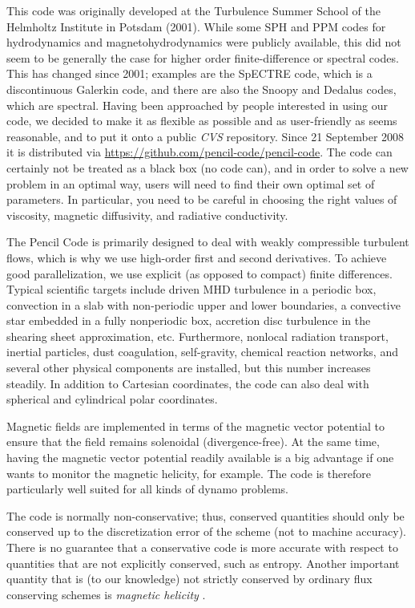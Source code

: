 \documentclass[\mydriver,12pt,twoside,notitlepage,a4paper]{article}
\makeatletter
\newcommand{\name}[2][]{%
  \def\index@{#1}%
  \textsl{#2\/}%
  \ifx\index@\@empty\index{#2@\MakeUppercase #2}%
  \else\index{#1}%
  \fi%
}
\makeatother
\begin{document}
This code was originally developed at the Turbulence Summer School of the
Helmholtz Institute in Potsdam (2001).
While some SPH and PPM codes for hydrodynamics and magnetohydrodynamics
were publicly available, this did not seem to be generally
the case for higher order finite-difference or spectral codes.
This has changed since 2001; examples are the SpECTRE code,
which is a discontinuous Galerkin code, and there are also the
Snoopy and Dedalus codes, which are spectral.
Having been approached by people interested in using our code, we
decided to make it as flexible as possible and as user-friendly as seems
reasonable, and to put it onto a public \name{CVS} repository.
Since 21 September 2008 it is distributed via
\url{https://github.com/pencil-code/pencil-code}.
The code can certainly not be treated as a black box (no code can), and in
order to solve a new problem in an optimal way, users will need to find their
own optimal set of parameters.
In particular, you need to be careful in choosing
the right values of viscosity, magnetic diffusivity, and radiative
conductivity.

The {\sc Pencil Code} is primarily designed to deal with weakly compressible
turbulent flows, which is why we use high-order first and second derivatives.
To achieve good parallelization, we use explicit
(as opposed to compact) finite differences.
Typical scientific targets include driven MHD turbulence in a periodic box,
convection in a slab with non-periodic upper and lower boundaries,
a convective star embedded in a fully nonperiodic box, accretion disc
turbulence in the shearing sheet approximation, etc.
Furthermore, nonlocal radiation transport, inertial particles,
dust coagulation, self-gravity, chemical reaction networks, and several
other physical components are installed, but this number increases steadily.
In addition to Cartesian coordinates, the code can also deal with spherical
and cylindrical polar coordinates.

Magnetic fields are implemented in terms of the magnetic vector potential
to ensure that the field remains solenoidal (divergence-free).
At the same time, having the magnetic
vector potential readily available is a big advantage if
one wants to monitor the magnetic helicity, for example.
The code is therefore particularly well suited for all kinds of
dynamo problems.

The code is normally non-conservative; thus, conserved quantities should only be
conserved up to the discretization error of the scheme (not to machine
accuracy).
There is no guarantee that a conservative code is more accurate with
respect to quantities that are not explicitly conserved, such as entropy.
Another important quantity that is (to our knowledge) not strictly
conserved by ordinary flux conserving schemes is \name{magnetic helicity}.
\end{document}
